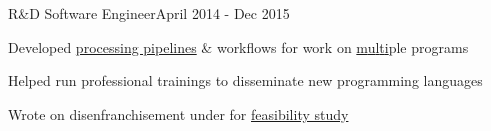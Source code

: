 \documentclass{article}
\newenvironment{**mylist}[2]{
  \subsubsection*{#1\hfill#2}
  \small
  \begin{list}{}{}
    \setlength{\topsep}{0pt}
   \setlength{\itemsep}{1pt}
   \setlength{\parskip}{0pt}
   \setlength{\parsep}{0pt}}{\end{list}\normalsize}
\newcommand{\LU}[1]{\hspace{-1em}{\bf Technologies : #1}}
\def\PT{{\bf(Part Time)}\xspace}
\begin{document}
\begin{comment}
\begin{((mylist}{\href{http://pdxcodeguild.com/}{\bf{PDXCodeGuild}} \PT \tabb {\bf{June 2016}}}
\item Developed \& taught introductory \href{https://github.com/probinso/Intro-to-Python}{python course} material for coding boot-camp
\item \hspace{-1em}
\end{**mylist}
\end{comment}

\begin{**mylist}{ \tabb R\&D Software Engineer}{April 2014 - Dec 2015}
\item Developed \href{https://github.com/probinso/ppaml-eval-tools}{processing pipelines} \& workflows for  work on \href{https://www.darpa.mil/program/probabilistic-programming-for-advancing-machine-learning}{m}\href{https://www.darpa.mil/program/cyber-fault-tolerant-attack-recovery}{u}\href{https://www.darpa.mil/program/safeware}{l}\href{https://www.darpa.mil/news-events/2015-05-18}{t}\href{https://www.darpa.mil/program/cyber-fault-tolerant-attack-recovery}{i}ple  programs
\item Helped run professional trainings to disseminate new  programming languages
\item
  Wrote on disenfranchisement under \href{https://freeandfair.us/}{} for 
  \href{https://usvotefoundation-drupal.s3.amazonaws.com/prod/E2EVIV_nontechnical_audience_report.pdf}{feasibility study}
  \begin{comment}
\item Contributed to
  \censor{\href{http://www.darpa.mil/program/probabilistic-programming-for-advancing-machine-Learning}{PPAML}},
  \censor{\href{https://www.usvotefoundation.org/sites/default/files/E2EVIV_nontechnical_audience_report.pdf}{Overseas Voting Foundation}},
  \censor{\href{https://www.darpa.mil/program/safeware}{Safeware}},
  \censor{\href{https://rft.osrfoundation.org/index.html}{Robot Fast Track}}
  \end{comment}
\end{**mylist}
\end{document}
